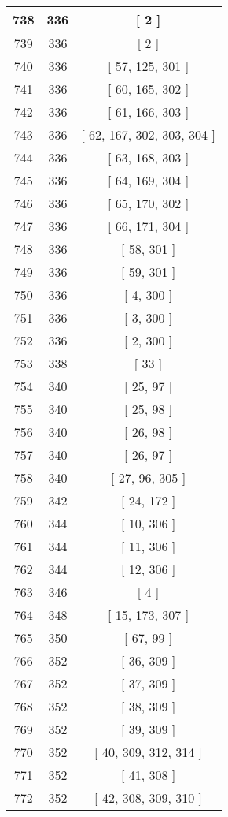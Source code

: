 \begin{center}
\begin{longtable}[H]{|| c c c ||}
\hline
738 & 336 & [ 2 ] \\ 
\hline
739 & 336 & [ 2 ] \\ 
\hline
740 & 336 & [ 57, 125, 301 ] \\ 
\hline
741 & 336 & [ 60, 165, 302 ] \\ 
\hline
742 & 336 & [ 61, 166, 303 ] \\ 
\hline
743 & 336 & [ 62, 167, 302, 303, 304 ] \\ 
\hline
744 & 336 & [ 63, 168, 303 ] \\ 
\hline
745 & 336 & [ 64, 169, 304 ] \\ 
\hline
746 & 336 & [ 65, 170, 302 ] \\ 
\hline
747 & 336 & [ 66, 171, 304 ] \\ 
\hline
748 & 336 & [ 58, 301 ] \\ 
\hline
749 & 336 & [ 59, 301 ] \\ 
\hline
750 & 336 & [ 4, 300 ] \\ 
\hline
751 & 336 & [ 3, 300 ] \\ 
\hline
752 & 336 & [ 2, 300 ] \\ 
\hline
753 & 338 & [ 33 ] \\ 
\hline
754 & 340 & [ 25, 97 ] \\ 
\hline
755 & 340 & [ 25, 98 ] \\ 
\hline
756 & 340 & [ 26, 98 ] \\ 
\hline
757 & 340 & [ 26, 97 ] \\ 
\hline
758 & 340 & [ 27, 96, 305 ] \\ 
\hline
759 & 342 & [ 24, 172 ] \\ 
\hline
760 & 344 & [ 10, 306 ] \\ 
\hline
761 & 344 & [ 11, 306 ] \\ 
\hline
762 & 344 & [ 12, 306 ] \\ 
\hline
763 & 346 & [ 4 ] \\ 
\hline
764 & 348 & [ 15, 173, 307 ] \\ 
\hline
765 & 350 & [ 67, 99 ] \\ 
\hline
766 & 352 & [ 36, 309 ] \\ 
\hline
767 & 352 & [ 37, 309 ] \\ 
\hline
768 & 352 & [ 38, 309 ] \\ 
\hline
769 & 352 & [ 39, 309 ] \\ 
\hline
770 & 352 & [ 40, 309, 312, 314 ] \\ 
\hline
771 & 352 & [ 41, 308 ] \\ 
\hline
772 & 352 & [ 42, 308, 309, 310 ] \\ 

\end{longtable}
\end{center}
